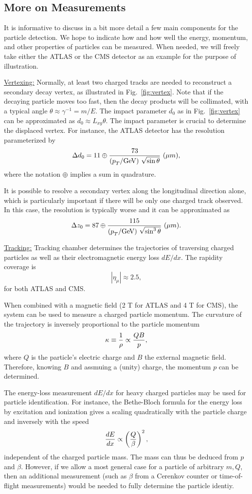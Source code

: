 \documentclass[12pt,prd,aps,floats,preprintnumbers,preprint,superscriptaddress,floatfix,nofootinbib]{revtex4}
\def\pt{p_T^{}}
\def\gev{{\rm GeV}}
\def\be{\begin{equation}}
\def\ee{\end{equation}}
\begin{document}
\subsection{More on Measurements}

It is  informative to discuss in a bit more detail a few main
components for the particle detection. We hope to indicate how and 
how well the energy, momentum, and other properties of particles
can be measured. When needed, we will freely take either the ATLAS 
or the CMS detector as an example  for the purpose of illustration.

\vskip 0.3cm
\noindent
\underline{Vertexing:} 
Normally, at least two charged tracks are needed 
to reconstruct a secondary decay vertex, as illustrated in Fig.~\ref{fig:vertex}.
Note that if the decaying particle moves too fast, then the decay products
will be collimated, with a typical angle $\theta \approx \gamma^{-1} =m/E$.
The impact parameter $d_0$ as in Fig.~\ref{fig:vertex} can be approximated
as $d_0\approx L_{xy} \theta$. 
The impact parameter is crucial to determine the displaced vertex.
For instance, the ATLAS detector \cite{ATLAS} has the resolution 
parameterized by 
\be
{\Delta d_0} = 11 \oplus {73\over (\pt/\gev)\ \sqrt{\sin\theta}}\ (\mu m),
\ee
where the notation $\oplus$ implies a sum in quadrature. 

It is possible to resolve a secondary vertex  along the longitudinal direction
alone, which is particularly important if there will be only one charged
track  observed. In this case, the resolution is typically worse and it can
be approximated \cite{ATLAS} as
\be
{\Delta z_0} = 87 \oplus {115 \over (\pt/\gev)\  \sqrt{\sin^3\theta}}\ (\mu m).
\ee

\vskip 0.3cm
\noindent
\underline{Tracking:} Tracking chamber determines the trajectories
of traversing charged particles as well as their electromagnetic energy
loss $dE/dx$. The rapidity coverage is 
\be
|\eta_\mu|\approx 2.5,
\ee
for both ATLAS and CMS.
 
When combined with a magnetic field (2 T for ATLAS and 4 T for CMS), 
the system can be used to measure a charged particle momentum.
The curvature of the trajectory is inversely proportional to the particle
momentum
\be
\kappa \equiv {1\over \rho} \propto {QB \over p},
\label{curv}
\ee
where $Q$ is the particle's electric charge and $B$ the external magnetic
field. Therefore, knowing $B$ and assmuing a (unity) charge, the momentum
$p$ can be determined. 

The energy-loss measurement $dE/dx$ for heavy charged particles 
may be used for particle identification. 
For instance, the Bethe-Bloch formula for the
energy loss by excitation and ionization gives a  scaling quadratically 
with the particle charge and inversely with the speed
\be
{dE\over dx} \propto \left({Q \over \beta} \right)^2,
\ee
independent of the charged particle mass. 
The mass can thus be deduced from $p$ and $\beta$. However, if we allow
a most general case for a particle of arbitrary $m,Q$, then an additional 
measurement (such as $\beta$ from a Cerenkov counter or time-of-flight
measurements) would be needed to fully determine the particle identiy.
\end{document}

